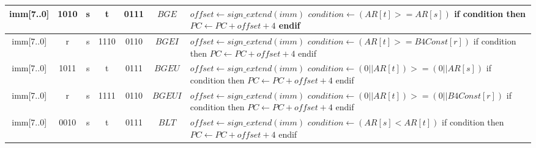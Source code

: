 \begin{longtable}{llllllllllllllllllllllll  p{1cm}  p{7cm} | }
		\multicolumn{8}{|c|}{imm[7..0]} & \multicolumn{4}{c|}{1010} & \multicolumn{4}{c|}{s} & \multicolumn{4}{c|}{t} & \multicolumn{4}{c|}{0111} & \multicolumn{1}{c|}{$BGE$} & $offset \leftarrow sign\_extend(imm)$ \newline $condition \leftarrow (AR[t] >= AR[s])$ \newline if condition then \newline $PC \leftarrow PC + offset + 4$ \newline endif\\ \hline
		\multicolumn{8}{|c|}{imm[7..0]} & \multicolumn{4}{c|}{r} & \multicolumn{4}{c|}{s} & \multicolumn{4}{c|}{1110} & \multicolumn{4}{c|}{0110} & \multicolumn{1}{c|}{$BGEI$} & $offset \leftarrow sign\_extend(imm)$ \newline $condition \leftarrow (AR[t] >= B4Const[r])$ \newline if condition then \newline $PC \leftarrow PC + offset + 4$ \newline endif\\ \hline
		\multicolumn{8}{|c|}{imm[7..0]} & \multicolumn{4}{c|}{1011} & \multicolumn{4}{c|}{s} & \multicolumn{4}{c|}{t} & \multicolumn{4}{c|}{0111} & \multicolumn{1}{c|}{$BGEU$} & $offset \leftarrow sign\_extend(imm)$ \newline $condition \leftarrow (0||AR[t]) >= (0||AR[s])$ \newline if condition then \newline $PC \leftarrow PC + offset + 4$ \newline endif\\ \hline
        \multicolumn{8}{|c|}{imm[7..0]} & \multicolumn{4}{c|}{r} & \multicolumn{4}{c|}{s} & \multicolumn{4}{c|}{1111} & \multicolumn{4}{c|}{0110} & \multicolumn{1}{c|}{$BGEUI$} & $offset \leftarrow sign\_extend(imm)$ \newline $condition \leftarrow (0||AR[t]) >= (0||B4Const[r])$ \newline if condition then \newline $PC \leftarrow PC + offset + 4$ \newline endif\\ \hline
		\multicolumn{8}{|c|}{imm[7..0]} & \multicolumn{4}{c|}{0010} & \multicolumn{4}{c|}{s} & \multicolumn{4}{c|}{t} & \multicolumn{4}{c|}{0111} & \multicolumn{1}{c|}{$BLT$} & $offset \leftarrow sign\_extend(imm)$ \newline $condition \leftarrow (AR[s] < AR[t])$ \newline if condition then \newline $PC \leftarrow PC + offset + 4$ \newline endif\\ \hline

\end{longtable}
